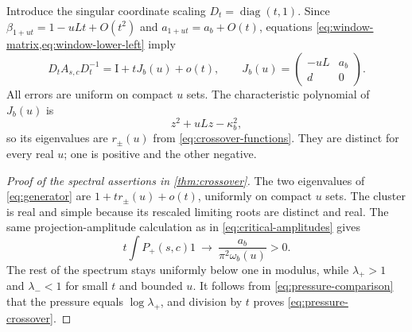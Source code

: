 \documentclass[11pt,a4paper]{article}
\numberwithin{equation}{section}
\theoremstyle{definition}
\theoremstyle{remark}
\newcommand{\Id}{\mathrm I}
\begin{document}
Introduce the singular coordinate scaling
$D_t=\operatorname{diag}(t,1)$. Since
$\beta_{1+ut}=1-uLt+O(t^2)$ and $a_{1+ut}=a_b+O(t)$, equations
\cref{eq:window-matrix,eq:window-lower-left} imply
\begin{equation}
 D_tA_{s,c}D_t^{-1}=\Id+tJ_b(u)+o(t),\qquad
 J_b(u)=\begin{pmatrix}-uL&a_b\\d&0\end{pmatrix}.
 \label{eq:generator}
\end{equation}
All errors are uniform on compact $u$ sets. The characteristic
polynomial of $J_b(u)$ is
\begin{equation}
 z^2+uLz-\kappa_b^2,
 \label{eq:generator-polynomial}
\end{equation}
so its eigenvalues are $r_\pm(u)$ from
\cref{eq:crossover-functions}. They are distinct for every real $u$;
one is positive and the other negative.

\begin{proof}[Proof of the spectral assertions in \cref{thm:crossover}]
The two eigenvalues of \cref{eq:generator} are
$1+tr_\pm(u)+o(t)$, uniformly on compact $u$ sets. The cluster is real
and simple because its rescaled limiting roots are distinct and real.
The same projection-amplitude calculation as in
\cref{eq:critical-amplitudes} gives
\begin{equation}
 t\int P_+(s,c)1\ \longrightarrow\
 \frac{a_b}{\pi^2\omega_b(u)}>0.
 \label{eq:window-amplitude}
\end{equation}
The rest of the spectrum stays uniformly below one in modulus, while
$\lambda_+>1$ and $\lambda_-<1$ for small $t$ and bounded $u$.
It follows from \cref{eq:pressure-comparison} that the pressure equals
$\log\lambda_+$, and division by $t$ proves
\cref{eq:pressure-crossover}.
\end{proof}
\end{document}
